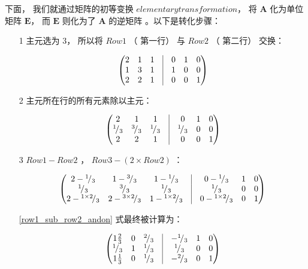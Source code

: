 \documentclass[a4paper, 8pt]{article}
\newcommand{\matr}[1]{\mathbf{#1}}
\newcommand*\rfrac[2]{{}^{#1}\!/_{#2}}
\begin{document}
下面， 我们就通过矩阵的初等变换 $\hyperref[elementary_trans]{elementary transformation}$， 将 $\matr{A}$ 化为单位矩阵 $\matr{E}$， 而 $\matr{E}$ 则化为了 $\matr{A}$ 的逆矩阵 。以下是转化步骤：

\begin{itemize}
\item[1] 主元选为 $3$， 所以将 $Row1$ （ 第一行） 与 $Row2$ （ 第二行） 交换：

\begin{equation}
\begin{pmatrix}
2 & 1 & 1 & \vline & 0&1&0 \\
1 & 3 & 1 & \vline & 1&0&0 \\
2 & 2 & 1 & \vline & 0&0&1\\
\end{pmatrix}
\end{equation}

\item[2] 主元所在行的所有元素除以主元：

\begin{equation}
\begin{pmatrix}
2 & 1 & 1 & \vline & 0&1&0 \\
\rfrac{1}{3} & \rfrac{3}{3} & \rfrac{1}{3} & \vline & \rfrac{1}{3}&0&0 \\
2 & 2 & 1 & \vline & 0&0&1\\
\end{pmatrix}
\end{equation}

\item[3] $Row1 - Row2$ ， $Row3 - (2 \times Row2)$ ：

\begin{equation} \label{row1_sub_row2_andon}
\begin{pmatrix}
2-\rfrac{1}{3} & 1-\rfrac{3}{3} & 1-\rfrac{1}{3} & \vline & 0-\rfrac{1}{3}&1&0 \\
\rfrac{1}{3} & \rfrac{3}{3} & \rfrac{1}{3} & \vline & \rfrac{1}{3}&0&0 \\
2-\rfrac{1\times 2}{3} & 2-\rfrac{3\times 2}{3} & 1-\rfrac{1\times 2}{3} & \vline & 0-\rfrac{1\times 2}{3}&0&1\\
\end{pmatrix}
\end{equation}

\ref{row1_sub_row2_andon} 式最终被计算为：

\begin{equation}
\begin{pmatrix}
1\frac{2}{3} & 0 & \rfrac{2}{3} & \vline & -\rfrac{1}{3} &1&0 \\
\rfrac{1}{3} & 1 & \rfrac{1}{3} & \vline & \rfrac{1}{3} &0&0 \\
1\frac{1}{3} & 0 & \rfrac{1}{3} & \vline & -\rfrac{2}{3} &0&1
\end{pmatrix}
\end{equation}


\end{itemize}
\end{document}

